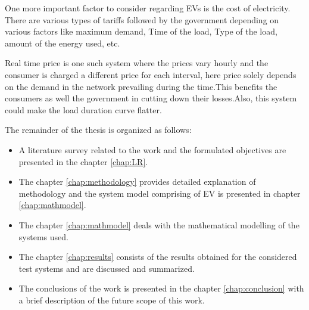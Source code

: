 	\noindent One more important factor to consider regarding EVs is the cost of electricity. There are various types of tariffs followed by the government depending on various factors like maximum demand, Time of the load, Type of the load, amount of the energy used, etc. 
	
	\noindent Real time price is one such system where the prices vary hourly and the consumer is charged a different price for each interval, here price solely depends on the demand in the network prevailing during the time.This benefits the consumers as well the government in cutting down their losses.Also, this system could make the load duration curve flatter.


	\par The remainder of the thesis is organized as follows:
	\begin{itemize}
		\item A literature survey related to the work and the formulated objectives are presented in the chapter \ref{chap:LR}.
		
		\item The chapter \ref{chap:methodology} provides detailed explanation
		of methodology and the system model comprising of EV is presented in chapter \ref{chap:mathmodel}.
		
		\item The chapter \ref{chap:mathmodel} deals with the mathematical modelling of the systems used.
		
		\item The chapter  \ref{chap:results} consists of the results obtained for the considered test systems and are discussed and summarized. 
		\item The conclusions of the work is presented in the chapter \ref{chap:conclusion} with a brief description of the future scope of this work.
	\end{itemize}
